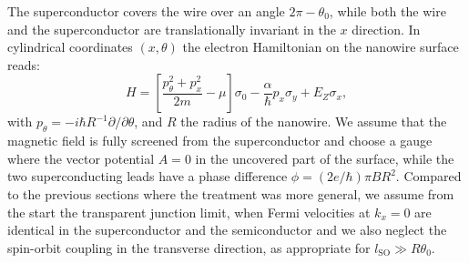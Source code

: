 The superconductor covers the wire over an angle $2\pi-\theta_0$, while both the wire and the superconductor are translationally invariant in the $x$ direction.
In cylindrical coordinates $(x, \theta)$ the electron Hamiltonian on the nanowire surface reads:
\begin{equation}
H=\left[\frac{p_\theta^2 + p_x^2}{2m}
-\mu\right]\sigma_0-\frac{\alpha}{\hbar}p_x\sigma_y
+E_Z\sigma_x,
\end{equation}
with $p_\theta = -i\hbar R^{-1}\partial/\partial \theta$, and $R$ the radius of the nanowire.
We assume that the magnetic field is fully screened from the superconductor and choose a gauge where the vector potential $A=0$ in the uncovered part of the surface, while the two superconducting leads have a phase difference $\phi = (2 e/\hbar) \pi B R^2$.
Compared to the previous sections where the treatment was more general, we assume from the start the transparent junction limit, when Fermi velocities at $k_x=0$ are identical in the superconductor and the semiconductor and we also neglect the spin-orbit coupling in the transverse direction, as appropriate for $l_\textrm{SO} \gg R \theta_0$.


